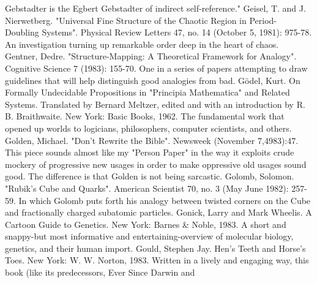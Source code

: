   Gebstadter is the Egbert Gebstadter of indirect self-reference."
Geisel, T. and J. Nierwetberg. "Universal Fine Structure of the Chaotic Region in Period-
  Doubling Systems". Physical Review Letters 47, no. 14 (October 5, 1981): 975-78. An
  investigation turning up remarkable order deep in the heart of chaos.
Gentner, Dedre. "Structure-Mapping: A Theoretical Framework for Analogy". Cognitive
  Science 7 (1983): 155-70. One in a series of papers attempting to draw guidelines that will
  help distinguish good analogies from bad.
Gödel, Kurt. On Formally Undecidable Propositions in "Principia Mathematica" and Related
  Systems. Translated by Bernard Meltzer, edited and with an introduction by R. B.
  Braithwaite. New York: Basic Books, 1962. The fundamental work that opened up worlds
  to logicians, philosophers, computer scientists, and others.
Golden, Michael. "Don't Rewrite the Bible". Newsweek (November 7,4983):47. This piece
  sounds almost like my "Person Paper" in the way it exploits crude mockery of progressive
  new usages in order to make oppressive old usages sound good. The difference is that
  Golden is not being sarcastic.
Golomb, Solomon. "Rubik's Cube and Quarks". American Scientist 70, no. 3 (May June
  1982): 257-59. In which Golomb puts forth his analogy between twisted corners on the
  Cube and fractionally charged subatomic particles.
Gonick, Larry and Mark Wheelis. A Cartoon Guide to Genetics. New York: Barnes \& Noble,
  1983. A short and snappy-but most informative and entertaining-overview of molecular
  biology, genetics, and their human import.
Gould, Stephen Jay. Hen's Teeth and Horse's Toes. New York: W. W. Norton, 1983. Written
  in a lively and engaging way, this book (like its predecessors, Ever Since Darwin and


